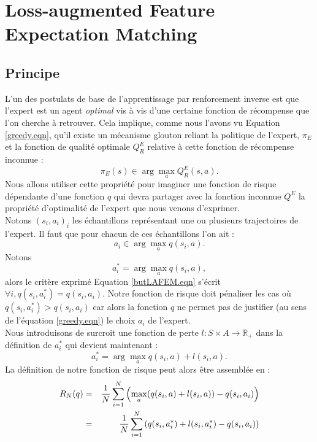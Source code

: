 \documentclass[publibook-draft]{CAp2012}
\begin{document}
\section{Loss-augmented Feature Expectation Matching}
\subsection{Principe}
L'un des postulats de base de l'apprentissage par renforcement inverse est que l'expert est un agent \emph{optimal} vis à vis d'une certaine fonction de récompense que l'on cherche à retrouver. Cela implique, comme nous l'avons vu Equation \ref{greedy.eqn}, qu'il existe un mécanisme glouton reliant la politique de l'expert, $\pi_E$ et la fonction de qualité optimale $Q^E_R$ relative à cette fonction de récompense inconnue :
\begin{equation}
\pi_E(s) \in \arg\max_aQ^E_R(s,a).
\end{equation}
Nous allons utiliser cette propriété pour imaginer une fonction de risque dépendante d'une fonction $q$ qui devra partager avec la fonction inconnue $Q^E$ la propriété d'optimalité de l'expert que nous venons d'exprimer.\\
Notons $(s_i,a_i)_i$ les échantillons représentant une ou plusieurs trajectoires de l'expert. Il faut que pour chacun de ces échantillons l'on ait :
\begin{equation}
\label{butLAFEM.eqn}
a_i \in \arg\max_aq(s_i,a).
\end{equation}
Notons
\begin{equation}
a^*_i = \arg\max_aq(s_i,a),
\end{equation}
alors le critère exprimé Equation \ref{butLAFEM.eqn} s'écrit $\forall i, q(s_i,a^*_i) = q(s_i,a_i)$. Notre fonction de risque doit pénaliser les cas où $q(s_i,a^*_i)>q(s_i,a_i)$ car alors la fonction $q$ ne permet pas de justifier (au sens de l'équation \ref{greedy.eqn}) le choix $a_i$ de l'expert.\\
Nous introduisons de surcroit une fonction de perte $l : S \times A \rightarrow \mathbb{R}_+$ dans la définition de $a^*_i$ qui devient maintenant :
\begin{equation}
\label{astar.def}
a^*_i = \arg\max_aq(s_i,a) + l(s_i,a).
\end{equation}
La définition de notre fonction de risque peut alors être assemblée en :
  \begin{eqnarray}
   R_N(q) &=& {1\over N} \sum_{i=1}^N\left(\max_{a}(q(s_i,a) + l(s_i,a)) - q(s_i,a_i) \right)\\
   &=& {1\over N} \sum_{i=1}^N\left(q(s_i,a_i^*) + l(s_i,a_i^*) - q(s_i,a_i) \right)
   \end{eqnarray}
\end{document}
